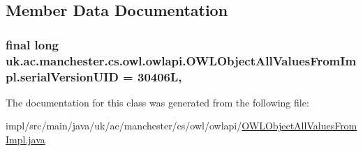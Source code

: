 \subsection{Member Data Documentation}
\hypertarget{classuk_1_1ac_1_1manchester_1_1cs_1_1owl_1_1owlapi_1_1_o_w_l_object_all_values_from_impl_a57f2995c5b9f43ab3935f78d5b87f11e}{
\subsubsection[{serial\-Version\-U\-I\-D}]{\setlength{\rightskip}{0pt plus 5cm}final long uk.\-ac.\-manchester.\-cs.\-owl.\-owlapi.\-O\-W\-L\-Object\-All\-Values\-From\-Impl.\-serial\-Version\-U\-I\-D = 30406\-L\hspace{0.3cm}{\ttfamily [static]}, {\ttfamily [private]}}}\label{classuk_1_1ac_1_1manchester_1_1cs_1_1owl_1_1owlapi_1_1_o_w_l_object_all_values_from_impl_a57f2995c5b9f43ab3935f78d5b87f11e}


The documentation for this class was generated from the following file\-:\begin{DoxyCompactItemize}
\item 
impl/src/main/java/uk/ac/manchester/cs/owl/owlapi/\hyperlink{_o_w_l_object_all_values_from_impl_8java}{O\-W\-L\-Object\-All\-Values\-From\-Impl.\-java}\end{DoxyCompactItemize}
